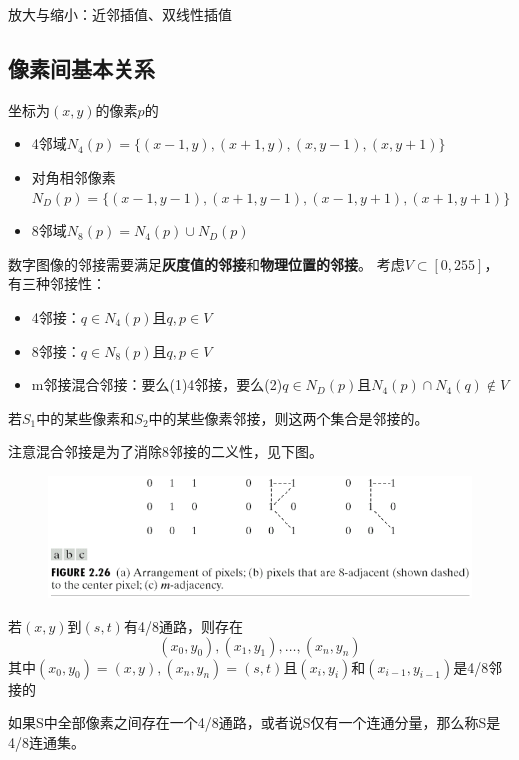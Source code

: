 放大与缩小：近邻插值、双线性插值

\subsection{像素间基本关系}
\begin{definition}[邻域]
坐标为$(x,y)$的像素$p$的
\begin{itemize}
\item 4邻域$N_4(p)=\{(x-1,y),(x+1,y),(x,y-1),(x,y+1)\}$
\item 对角相邻像素$N_D(p)=\{(x-1,y-1),(x+1,y-1),(x-1,y+1),(x+1,y+1)\}$
\item 8邻域$N_8(p)=N_4(p)\cup N_D(p)$
\end{itemize}
\end{definition}

\begin{definition}[邻接性]
数字图像的邻接需要满足\textbf{灰度值的邻接}和\textbf{物理位置的邻接}。
考虑$V\subset[0,255]$，有三种邻接性：
\begin{itemize}
	\item 4邻接：$q\in N_4(p)$且$q,p\in V$
	\item 8邻接：$q\in N_8(p)$且$q,p\in V$
	\item m邻接混合邻接：要么(1)4邻接，要么(2)$q\in N_D(p)$且$N_4(p)\cap N_4(q)\notin V$
\end{itemize}
若$S_1$中的某些像素和$S_2$中的某些像素邻接，则这两个集合是邻接的。
\end{definition}

注意混合邻接是为了消除8邻接的二义性，见下图。
\begin{figure}[H]
\centering
\includegraphics[width=0.6\linewidth]{fig/adjacency.png}
\end{figure}

\begin{definition}[通路]
若$(x,y)$到$(s,t)$有4/8通路，则存在
\[(x_0,y_0),(x_1,y_1),\ldots,(x_n,y_n)\]
其中$(x_0,y_0)=(x,y),(x_n,y_n)=(s,t)$且$(x_i,y_i)$和$(x_{i-1},y_{i-1})$是4/8邻接的
\end{definition}

\begin{definition}[连通集]
如果S中全部像素之间存在一个4/8通路，或者说S仅有一个连通分量，那么称S是4/8连通集。 
\end{definition}

